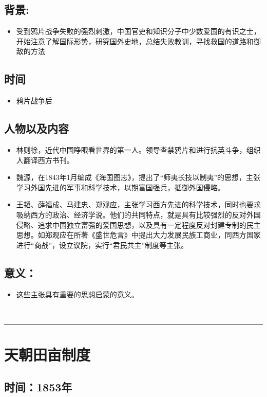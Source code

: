 \documentclass{article}
\begin{document}
\subsection*{背景:}
\begin{itemize}
	\item 受到鸦片战争失败的强烈刺激，中国官吏和知识分子中少数爱国的有识之士，开始注意了解国际形势，研究国外史地，总结失败教训，寻找救国的道路和御敌的方法
\end{itemize}
\subsection*{时间}
\begin{itemize}
	\item 鸦片战争后
\end{itemize}
\subsection*{人物以及内容}
\begin{itemize}
    \item 林则徐，近代中国睁眼看世界的第一人。领导查禁鸦片和进行抗英斗争，组织人翻译西方书刊。
    \item 魏源，在1843年1月编成《海国图志》，提出了“师夷长技以制夷”的思想，主张学习外国先进的军事和科学技术，以期富国强兵，抵御外国侵略。
    \item 王韬、薛福成、马建忠、郑观应，主张学习西方先进的科学技术，同时也要求吸纳西方的政治、经济学说。他们的共同特点，就是具有比较强烈的反对外国侵略、追求中国独立富强的爱国思想，以及具有一定程度反对封建专制的民主思想。如郑观应在所著《盛世危言》中提出大力发展民族工商业，同西方国家进行“商战”，设立议院，实行“君民共主”制度等主张。
\end{itemize}
\subsection*{意义：}
\begin{itemize}
	\item 这些主张具有重要的思想启蒙的意义。
\end{itemize}
\ \hrule

\section*{天朝田亩制度}
\subsection*{时间：1853年}
\end{document}
